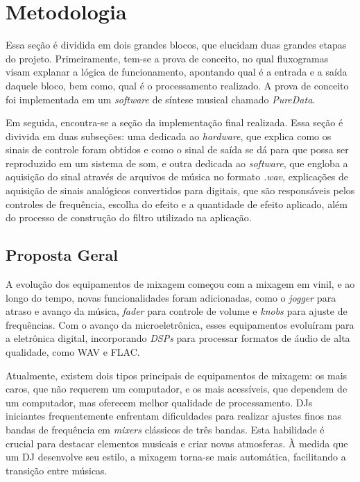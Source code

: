 \chapter[Metodologia]{Metodologia}

Essa seção é dividida em dois grandes blocos, que elucidam duas grandes etapas do projeto. Primeiramente, tem-se a prova de conceito, no qual fluxogramas visam explanar a lógica de funcionamento, apontando qual é a entrada e a saída daquele bloco, bem como, qual é o processamento realizado. A prova de conceito foi implementada em um \textit{software} de síntese musical chamado \textit{PureData}.


Em seguida, encontra-se a seção da implementação final realizada. Essa seção é divivida em duas subseções: uma dedicada ao \textit{hardware}, que explica como os sinais de controle foram obtidos e como o sinal de saída se dá para que possa ser reproduzido em um sistema de som, e outra dedicada ao \textit{software}, que engloba a aquisição do sinal através de arquivos de música no formato \textit{.wav}, explicações de aquisição de sinais analógicos convertidos para digitais, que são responsáveis pelos controles de frequência, escolha do efeito e a quantidade de efeito aplicado, além do processo de construção do filtro utilizado na aplicação.

\section{Proposta Geral}

A evolução dos equipamentos de mixagem começou com a mixagem em vinil, e ao longo do tempo, novas funcionalidades foram adicionadas, como o \textit{jogger} para atraso e avanço da música, \textit{fader} para controle de volume e \textit{knobs} para ajuste de frequências. Com o avanço da microeletrônica, esses equipamentos evoluíram para a eletrônica digital, incorporando \textit{DSPs} para processar formatos de áudio de alta qualidade, como WAV e FLAC.

Atualmente, existem dois tipos principais de equipamentos de mixagem: os mais caros, que não requerem um computador, e os mais acessíveis, que dependem de um computador, mas oferecem melhor qualidade de processamento. DJs iniciantes frequentemente enfrentam dificuldades para realizar ajustes finos nas bandas de frequência em \textit{mixers} clássicos de três bandas. Esta habilidade é crucial para destacar elementos musicais e criar novas atmosferas. À medida que um DJ desenvolve seu estilo, a mixagem torna-se mais automática, facilitando a transição entre músicas.

